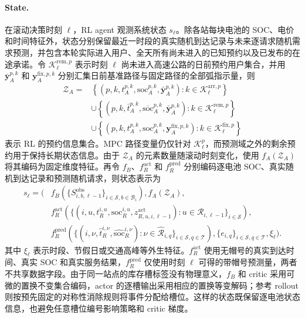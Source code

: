 \documentclass[12pt,a4paper,UTF8]{ctexart}
\begin{document}
\paragraph{State.}
在滚动决策时刻 $\ell$，RL agent 观测系统状态 $s_\ell$。除各站每块电池的 SOC、电价和时间特征外，状态分别保留最近一时段的真实随机到达记录与未来逐请求随机需求预测，并包含本轮实际进入用户、全天所有尚未进入的已知预约以及已发布的在途承诺。令
$\mathcal K_\ell^{\mathrm{rem},p}$ 表示时刻 $\ell$ 尚未进入高速公路的日前预约用户集合，并用 $\bar{\mathbf y}_A^{p,k}$ 和 $\mathbf y_A^{\mathrm{fix},p,k}$ 分别汇集日前基准路径与固定路径的全部弧指示量，则
\begin{equation}
\begin{aligned}
\mathcal Z_{A}
={}&
\left\{
\left(p,k,t_A^{p,k},
\mathrm{soc}_A^{p,k},
\bar{\mathbf y}_A^{p,k}\right):
k\in\mathcal K_\ell^{\mathrm{arr},p}
\right\}\\
&\cup
\left\{
\left(p,k,\bar t_A^{p,k},
\overline{\mathrm{soc}}_A^{p,k},
\bar{\mathbf y}_A^{p,k}\right):
k\in\mathcal K_\ell^{\mathrm{rem},p}
\right\}\\
&\cup
\left\{
\left(p,k,t_A^{p,k},\mathrm{soc}_A^{p,k},
\mathbf y_A^{\mathrm{fix},p,k}\right):
k\in\mathcal K_\ell^{\mathrm{fix},p}
\right\}
\end{aligned}
\label{eq:rl_reservation_information}
\end{equation}
表示 RL 的预约信息集合。MPC 路径变量仍仅针对
$\mathcal K_\ell^p$，而预测域之外的剩余预约用于保持长期状态信息。由于 $\mathcal Z_{A}$ 的元素数量随滚动时刻变化，使用
$f_A(\mathcal Z_{A})$ 将其编码为固定维度特征。再令 $f_B$、$f_R^{\mathrm{act}}$ 和 $f_R^{\mathrm{pred}}$ 分别编码逐电池 SOC、真实随机到达记录和预测随机请求，则状态表示为
\begin{equation}
\begin{aligned}
s_\ell=\Big(&
f_B\!\left(\{S_{i,b,\ell-1}^{\mathrm{obs}}\}_{i\in\mathcal S,b\in\mathcal B_i}\right),
f_A(\mathcal Z_{A}),\\
&
f_R^{\mathrm{act}}\!\left(
\{(i,u,t_R^{i,u},\mathrm{soc}_R^{i,u},z_{R,u,i,\ell-1}^{\mathrm{act}}):
u\in\mathcal R_{i,\ell-1}\}_{i\in\mathcal S}
\right),\\
&
f_R^{\mathrm{pred}}\!\left(
\{(i,\nu,\widehat t_{R}^{i,\nu},\widehat{\mathrm{soc}}_{R}^{i,\nu}):
\nu\in\widehat{\mathcal R}_{i,q}\}_{i\in\mathcal S,q\in\mathcal T}
\right),
\{e_{i,q}\}_{i\in\mathcal S,q\in\mathcal T},
\xi_\ell
\Big).
\end{aligned}
\label{eq:rl_state}
\end{equation}
其中 $\xi_\ell$ 表示时段、节假日或交通高峰等外生特征。$f_R^{\mathrm{act}}$ 使用无帽号的真实到达时间、真实 SOC 和真实服务结果，$f_R^{\mathrm{pred}}$ 仅使用时刻 $\ell$ 可得的带帽号预测量，两者不共享数据字段。由于同一站点的库存槽标签没有物理意义，$f_B$ 和 critic 采用可微的置换不变集合编码，actor 的逐槽输出采用相应的置换等变解码；参考 rollout 则按预先固定的对称性消除规则将事件分配给槽位。这样的状态既保留逐电池状态信息，也避免任意槽位编号影响策略和 critic 梯度。
\end{document}
